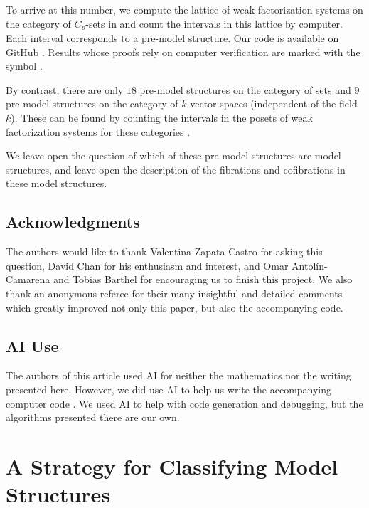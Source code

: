 \documentclass{amsart}
\newcommand{\computerassisted}{\faLaptopCode}
\numberwithin{equation}{section}
\theoremstyle{definition}
\begin{document}
To arrive at this number, we compute the lattice of weak factorization systems on the category of $C_p$-sets in  and count the intervals in this lattice by computer. Each interval corresponds to a pre-model structure.
Our code is available on GitHub \cite{code}. Results whose proofs rely on computer verification are marked with the symbol \computerassisted.

By contrast, there are only $18$ pre-model structures on the category of sets and $9$ pre-model structures on the category of $k$-vector spaces (independent of the field $k$). These can be found by counting the intervals in the posets of weak factorization systems for these categories \cite[Diagrams 3.5 and 6.5]{ACB2025}.

We leave open the question of which of these pre-model structures are model structures, and leave open the description of the fibrations and cofibrations in these model structures.

\subsection*{Acknowledgments}

The authors would like to thank Valentina Zapata Castro for asking this question, David Chan for his enthusiasm and interest, and Omar Antol\'in-Camarena and Tobias Barthel for encouraging us to finish this project. We also thank an anonymous referee for their many insightful and detailed comments which greatly improved not only this paper, but also the accompanying code.

\subsection*{AI Use}

The authors of this article used AI for neither the mathematics nor the writing presented here. However, we did use AI to help us write the accompanying computer code \cite{code}. We used AI to help with code generation and debugging, but the algorithms presented there are our own.


\section{A Strategy for Classifying Model Structures}
\label{section: the strategy}
\end{document}
